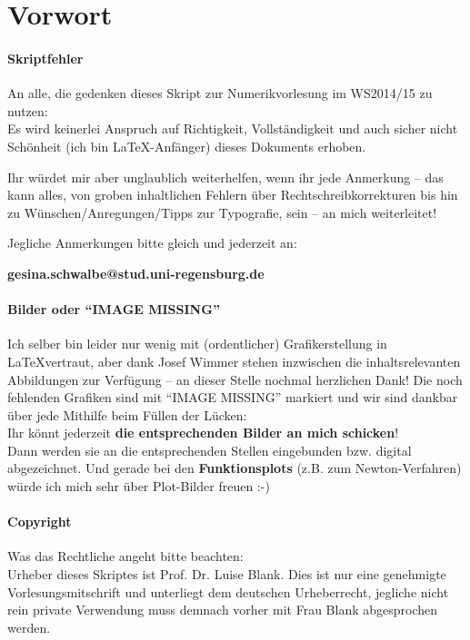 % 
% 
% 
% 


\chapter*{Vorwort}
\subsubsection{Skriptfehler}
An alle, die gedenken dieses Skript zur Numerikvorlesung im WS2014/15 zu 
nutzen: \\
Es wird keinerlei Anspruch auf Richtigkeit, Vollständigkeit und auch sicher nicht Schönheit
(ich bin \LaTeX-Anfänger) dieses Dokuments erhoben.

Ihr würdet mir aber unglaublich weiterhelfen, wenn ihr jede Anmerkung 
-- das kann alles, von groben inhaltlichen 
Fehlern über Rechtschreibkorrekturen bis hin zu Wünschen/Anregungen/Tipps zur Typografie, sein --
an mich weiterleitet!

Jegliche Anmerkungen bitte gleich und jederzeit an:
\begin{center}
  \textbf{\large
    gesina.schwalbe@stud.uni-regensburg.de}
\end{center}
\hspace{1cm}


\subsubsection{Bilder oder \enquote{IMAGE MISSING}}
Ich selber bin leider nur wenig mit (ordentlicher) Grafikerstellung in \LaTeX vertraut,
aber dank Josef Wimmer stehen inzwischen die inhaltsrelevanten Abbildungen zur Verfügung
-- an dieser Stelle nochmal herzlichen Dank!
Die noch fehlenden Grafiken sind mit \enquote{IMAGE MISSING} markiert und
wir sind dankbar über jede Mithilfe beim Füllen der Lücken:\\
Ihr könnt jederzeit \textbf{die entsprechenden Bilder an mich schicken}!\\
Dann werden sie an die entsprechenden Stellen eingebunden
bzw. digital abgezeichnet.
Und gerade bei den \textbf{Funktionsplots} (z.B. zum Newton-Verfahren)
würde ich mich sehr über Plot-Bilder freuen :-)


\subsubsection{Copyright}
Was das Rechtliche angeht bitte beachten: \\
Urheber dieses Skriptes ist Prof. Dr. Luise Blank.
Dies ist nur eine genehmigte Vorlesungsmitschrift und unterliegt dem deutschen
Urheberrecht, jegliche nicht rein private Verwendung muss demnach vorher mit
Frau Blank abgesprochen werden.

